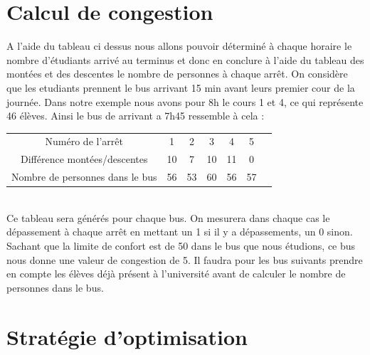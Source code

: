 \documentclass[a4paper,11pt]{article}
\begin{document}
\section{Calcul de congestion}
	A l'aide du tableau ci dessus nous allons pouvoir déterminé à chaque horaire le nombre d'étudiants arrivé au terminus et donc en conclure à l'aide du tableau des montées et des descentes le nombre de personnes à chaque arrêt. 
	On considère que les etudiants prennent le bus arrivant 15 min avant leurs premier cour de la journée.
	Dans notre exemple nous avons pour  8h le cours 1 et 4, ce qui représente 46 élèves. Ainsi le bus de arrivant a 7h45 ressemble à cela :  \\
	\begin{tabular}{ | c | c | c | c | c | c | c |}
 			\hline			
   			Numéro de l'arrêt & 1 & 2 & 3 & 4 & 5\\
   			Différence montées/descentes & 10 & 7 & 10 & 11 & 0\\
   			Nombre de personnes dans le bus & 56 & 53 & 60 & 56 & 57\\
 			\hline  
 	\end{tabular}\\
 	Ce tableau sera générés pour chaque bus. On mesurera dans chaque cas le dépassement à chaque arrêt en mettant un 1 si il y a dépassements, un 0 sinon.
 	Sachant que la limite de confort est de 50 dans le bus que nous étudions, ce bus nous donne une valeur de congestion de 5.
 	Il faudra pour les bus suivants prendre en compte les élèves déjà présent à l'université avant de calculer le nombre de personnes dans le bus.

\section{Stratégie d'optimisation}
\end{document}
